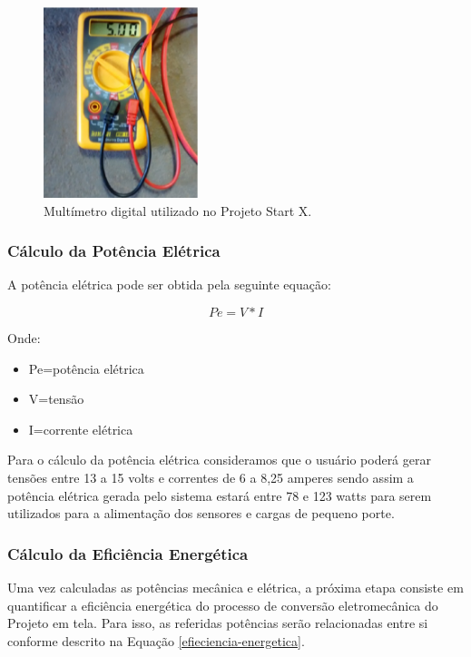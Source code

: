 \begin{figure}
  \centering
  \includegraphics[width=0.4\textwidth]{figuras/image3}
  \caption{Multímetro digital utilizado no Projeto Start X.}
  \label{multimetro}
\end{figure}

\subsubsection{Cálculo da Potência Elétrica}

A potência elétrica pode ser obtida pela seguinte equação:

\begin{equation}
  Pe=V\ast I
  \label{potencia-eletrica}
\end{equation}

Onde:

\begin{itemize}
  \item Pe=potência elétrica
  \item V=tensão 
  \item I=corrente elétrica
\end{itemize}

Para o cálculo da potência elétrica consideramos que o usuário poderá gerar tensões entre 13 a 15 volts e correntes de 6 a 8,25 amperes sendo assim a potência elétrica gerada pelo sistema estará entre 78 e 123 watts para serem utilizados para a alimentação dos sensores e cargas de pequeno porte.

\subsubsection{Cálculo da Eficiência Energética}
\label{calculo-eficiencias-energeticas}

Uma vez calculadas as potências mecânica e elétrica, a próxima etapa consiste em quantificar a eficiência energética do processo de conversão eletromecânica do Projeto em tela. Para isso, as referidas potências serão relacionadas entre si conforme descrito na Equação \ref{efieciencia-energetica}.

